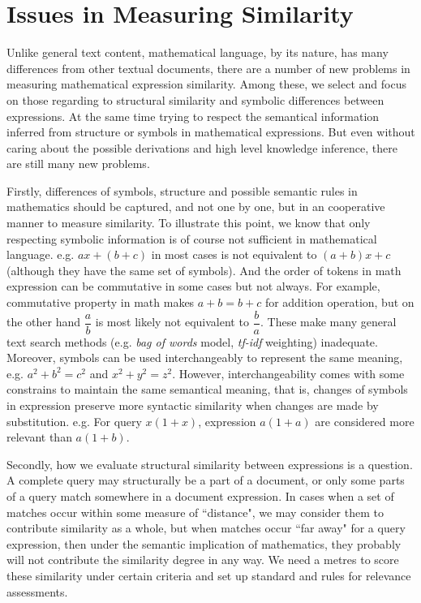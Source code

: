 \section{Issues in Measuring Similarity}
\label{measure_sim}
Unlike general text content, mathematical language, by its nature, has many differences from other textual documents, there are a number of new problems in measuring mathematical expression similarity. 
Among these, we select and focus on those regarding to structural similarity and symbolic differences between expressions. 
At the same time trying to respect the semantical information inferred from structure or symbols in mathematical expressions.
But even without caring about the possible derivations and high level knowledge inference, there are still many new problems.

Firstly, differences of symbols, structure and possible semantic rules in mathematics should be captured, and not one by one, but in an cooperative manner to measure similarity. 
To illustrate this point, we know that only respecting symbolic information is of course not sufficient in mathematical language. e.g. $ax+(b+c)$ in most cases is not equivalent to $(a+b)x+c$ (although they have the same set of symbols).
And the order of tokens in math expression can be commutative in some cases but not always. For example, commutative property in math makes $a+b=b+c$ for addition operation, but on the other hand $\dfrac a b$ is most likely not equivalent to $\dfrac b a$.
These make many general text search methods (e.g. \textit{bag of words} model, \textit{tf-idf} weighting) inadequate. 
Moreover, symbols can be used interchangeably to represent the same meaning, e.g. $a^2+b^2=c^2$ and $x^2+y^2=z^2$. 
However, interchangeability comes with some constrains to maintain the same semantical meaning, that is, changes of symbols in expression preserve more syntactic similarity when changes are made by substitution. e.g. For query $x(1+x)$, expression $a(1+a)$ are considered more relevant than $a(1+b)$. 

Secondly, how we evaluate structural similarity between expressions is a question. A complete query may structurally be a part of a document, or only some parts of a query match somewhere in a document expression.
In cases when a set of matches occur within some measure of ``distance", we may consider them to contribute similarity as a whole, but when matches occur ``far away" for a query expression, then under the semantic implication of mathematics, they probably will not contribute the similarity degree in any way.
We need a metres to score these similarity under certain criteria and set up standard and rules for relevance assessments.

